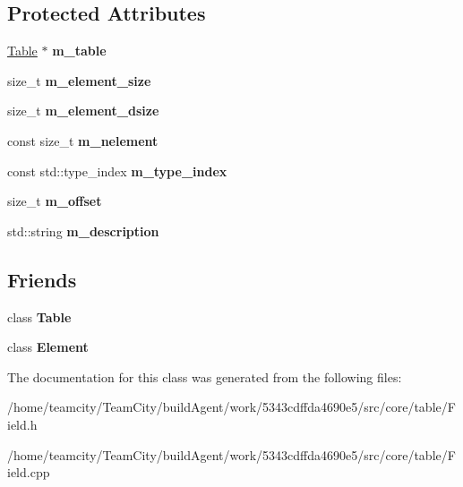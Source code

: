 \subsection*{Protected Attributes}
\begin{DoxyCompactItemize}
\item 
\hyperlink{classTable}{Table} $\ast$ {\bfseries m\+\_\+table}\hypertarget{classField_a54a544919cae4a82cc3b0a0f27a9ae83}{}\label{classField_a54a544919cae4a82cc3b0a0f27a9ae83}

\item 
size\+\_\+t {\bfseries m\+\_\+element\+\_\+size}\hypertarget{classField_afb9ba6afceb67426d1c2e701c431d0dc}{}\label{classField_afb9ba6afceb67426d1c2e701c431d0dc}

\item 
size\+\_\+t {\bfseries m\+\_\+element\+\_\+dsize}\hypertarget{classField_a27d0770760813f5575572c321bc5dfb4}{}\label{classField_a27d0770760813f5575572c321bc5dfb4}

\item 
const size\+\_\+t {\bfseries m\+\_\+nelement}\hypertarget{classField_ab75911accbec2a191ca4d3e83ae0d8d6}{}\label{classField_ab75911accbec2a191ca4d3e83ae0d8d6}

\item 
const std\+::type\+\_\+index {\bfseries m\+\_\+type\+\_\+index}\hypertarget{classField_a48aad74f71a6d7e4e433f5f9b3d5f6aa}{}\label{classField_a48aad74f71a6d7e4e433f5f9b3d5f6aa}

\item 
size\+\_\+t {\bfseries m\+\_\+offset}\hypertarget{classField_abae1dcf7cb1039f6742d6eafdf23b410}{}\label{classField_abae1dcf7cb1039f6742d6eafdf23b410}

\item 
std\+::string {\bfseries m\+\_\+description}\hypertarget{classField_aff8011af4412aca320a1ecfc1ae9be1c}{}\label{classField_aff8011af4412aca320a1ecfc1ae9be1c}

\end{DoxyCompactItemize}
\subsection*{Friends}
\begin{DoxyCompactItemize}
\item 
class {\bfseries Table}\hypertarget{classField_af888815e80064bc9fa1035c6265da86e}{}\label{classField_af888815e80064bc9fa1035c6265da86e}

\item 
class {\bfseries Element}\hypertarget{classField_a016b821f88c7c0a2de1451c175cefbf9}{}\label{classField_a016b821f88c7c0a2de1451c175cefbf9}

\end{DoxyCompactItemize}


The documentation for this class was generated from the following files\+:\begin{DoxyCompactItemize}
\item 
/home/teamcity/\+Team\+City/build\+Agent/work/5343cdffda4690e5/src/core/table/Field.\+h\item 
/home/teamcity/\+Team\+City/build\+Agent/work/5343cdffda4690e5/src/core/table/Field.\+cpp\end{DoxyCompactItemize}
